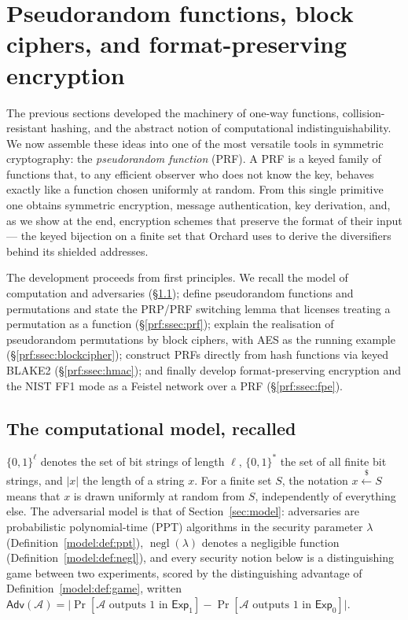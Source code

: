 \documentclass[11pt,a4paper]{article}
\theoremstyle{definition}
\theoremstyle{remark}
\DeclareMathOperator{\negl}{negl}
\begin{document}
\clearpage

\section{Pseudorandom functions, block ciphers, and format-preserving encryption}\label{sec:prf}

The previous sections developed the machinery of one-way functions, collision-resistant hashing, and the abstract notion of computational indistinguishability. We now assemble these ideas into one of the most versatile tools in symmetric cryptography: the \emph{pseudorandom function} (PRF). A PRF is a keyed family of functions that, to any efficient observer who does not know the key, behaves exactly like a function chosen uniformly at random. From this single primitive one obtains symmetric encryption, message authentication, key derivation, and, as we show at the end, encryption schemes that preserve the format of their input --- the keyed bijection on a finite set that Orchard uses to derive the diversifiers behind its shielded addresses.

The development proceeds from first principles. We recall the model of computation and adversaries (\S\ref{prf:ssec:model}); define pseudorandom functions and permutations and state the PRP/PRF switching lemma that licenses treating a permutation as a function (\S\ref{prf:ssec:prf}); explain the realisation of pseudorandom permutations by block ciphers, with AES as the running example (\S\ref{prf:ssec:blockcipher}); construct PRFs directly from hash functions via keyed BLAKE2 (\S\ref{prf:ssec:hmac}); and finally develop format-preserving encryption and the NIST FF1 mode as a Feistel network over a PRF (\S\ref{prf:ssec:fpe}).

\subsection{The computational model, recalled}\label{prf:ssec:model}

\(\{0,1\}^{\ell}\) denotes the set of bit strings of length \(\ell\), \(\{0,1\}^{*}\) the set of all finite bit strings, and \(|x|\) the length of a string \(x\). For a finite set \(S\), the notation \(x \xleftarrow{\$} S\) means that \(x\) is drawn uniformly at random from \(S\), independently of everything else. The adversarial model is that of Section~\ref{sec:model}: adversaries are probabilistic polynomial-time (PPT) algorithms in the security parameter \(\lambda\) (Definition~\ref{model:def:ppt}), \(\negl(\lambda)\) denotes a negligible function (Definition~\ref{model:def:negl}), and every security notion below is a distinguishing game between two experiments, scored by the distinguishing advantage of Definition~\ref{model:def:game}, written \(\mathsf{Adv}(\mathcal{A}) = \bigl|\Pr[\mathcal{A} \text{ outputs } 1 \text{ in } \mathsf{Exp}_1] - \Pr[\mathcal{A} \text{ outputs } 1 \text{ in } \mathsf{Exp}_0]\bigr|\).
\end{document}
